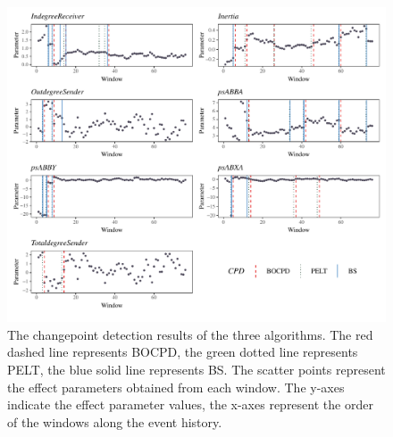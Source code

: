 \documentclass[]{interact}
\theoremstyle{plain}%
\theoremstyle{definition}
\theoremstyle{remark}
\begin{document}
	\begin{figure}[H]
		\captionsetup{justification=raggedright}
		\renewcommand{\figurename}{Figure}
		\centering
		\includegraphics[width=\textwidth,height=\textheight,keepaspectratio]{Apollo_CPD_bw}
		\caption{\fontsize{8}{10}\selectfont The changepoint detection results of the three algorithms. The red dashed line represents BOCPD, the green dotted line represents PELT, the blue solid line represents BS. The scatter points represent the effect parameters obtained from each window. The y-axes indicate the effect parameter values, the x-axes represent the order of the windows along the event history.}
		\label{Apollo_effects_cp_plot}
	\end{figure}
\end{document}
